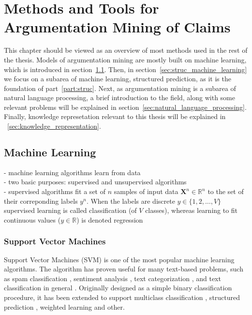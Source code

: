 \chapter{Methods and Tools for Argumentation Mining of Claims}

This chapter should be viewed as an overview of most methods used in the rest
of the thesis. Models of argumentation mining are mostly built on machine
learning, which is introduced in section~\ref{sec:unstruc_machine_learning}.
Then, in section~\ref{sec:struc_machine_learning} we focus on a
subarea of machine learning, structured prediction, as it is the foundation of
part~\ref{part:struc}. Next, as argumentation mining is a subarea of 
natural language processing, a brief introduction to the field, along with some
relevant problems will be explained in section~\ref{sec:natural_language_processing}. 
Finally, knowledge represetation relevant to this thesis will be explained in
~\ref{sec:knowledge_representation}. 

\section{Machine Learning}
\label{sec:unstruc_machine_learning}

- machine learning algorithms learn from data \\
- two basic purposes: supervised and unsupervised algorithms \\
- supervised algorithms fit a set of $n$ samples of 
input data $\textbf{X}^n \in \mathbb{R}^n$ to the set of their correponding 
labels $y^n $. When the labels are discrete $y \in \{1, 2, \dots , V\}$ 
supervised learning is called classification (of $V$ classes), 
whereas learning to fit continuous values ($y \in \mathbb{R}$) 
is denoted regression \\

\subsection{Support Vector Machines}
\label{sec:svm}

Support Vector Machines (SVM) \citep{cortes1995support} is one of the most
popular machine learning algorithms. The algorithm has proven useful for many
text-based problems, such as spam classification \citep{drucker1999support},
sentiment analysis \citep{wang2012baselines}, text categorization
\citep{joachims1998text}, and text classification in general
\citep{tong2001support, ikonomakis2005text}. Originally designed as a simple
binary classification procedure, it has been extended to support multiclass
classification \citep{weston1998multi}, structured prediction
\citep{tsochantaridis2005large}, weighted learning \citep{huang2005weighted} and
other. 


